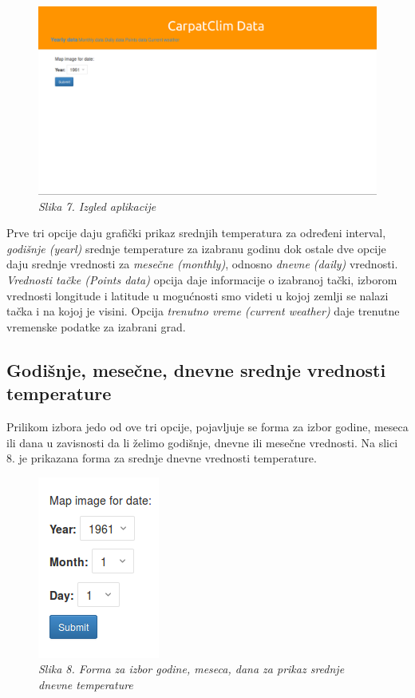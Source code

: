 \documentclass[12pt]{article}
\begin{document}
\begin{figure}[h!]
	\centering
	\includegraphics[width=1\linewidth]{aplikacija.png}
	\caption*{\textsl{Slika 7. Izgled aplikacije}}
\end{figure}

Prve tri opcije daju grafički prikaz srednjih temperatura za određeni interval, \textit{godišnje (yearl)} srednje temperature za izabranu godinu dok ostale dve opcije daju srednje vrednosti za \textit{mesečne (monthly)}, odnosno \textit{dnevne (daily)} vrednosti. \textit{Vrednosti tačke (Points data)} opcija daje informacije o izabranoj tački, izborom vrednosti longitude i latitude u mogućnosti smo videti u kojoj zemlji se nalazi tačka i na kojoj je visini. Opcija \textit{trenutno vreme (current weather)} daje trenutne vremenske podatke za izabrani grad. 


\subsection{Godišnje, mesečne, dnevne srednje vrednosti temperature}

Prilikom izbora jedo od ove tri opcije, pojavljuje se forma za izbor godine, meseca ili dana u zavisnosti da li želimo godišnje, dnevne ili mesečne vrednosti. Na slici 8. je prikazana forma za srednje dnevne vrednosti temperature.   



\begin{figure}[!htb]
\centering
\includegraphics[width=0.2\linewidth]{Daily.png}
\caption*{\textsl{Slika 8. Forma za izbor godine, meseca, dana za prikaz srednje dnevne temperature}}
\end{figure}
\end{document}
